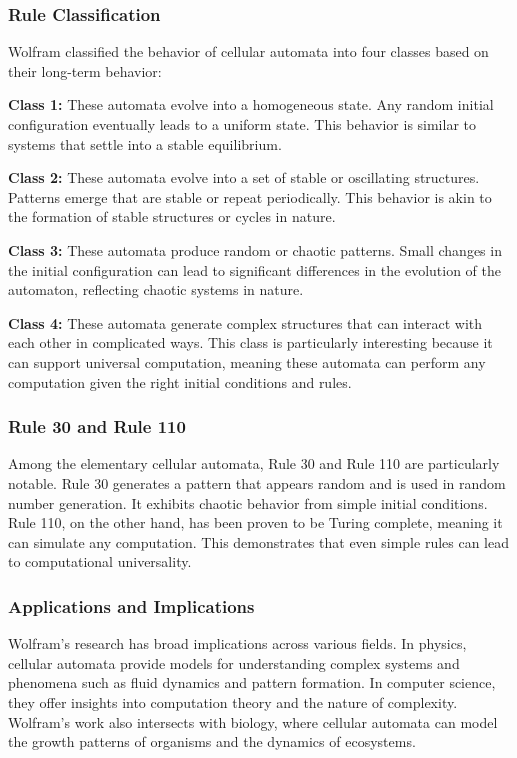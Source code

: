 \documentclass[9pt,a4paper,twoside]{tau-class/tau}
\begin{document}
    \subsubsection{Rule Classification}

    Wolfram classified the behavior of cellular automata into four classes based on their long-term behavior:\cite{wolfram1984}

    \textbf{Class 1:} These automata evolve into a homogeneous state. Any random initial configuration eventually leads to a uniform state. This behavior is similar to systems that settle into a stable equilibrium.

    \textbf{Class 2:} These automata evolve into a set of stable or oscillating structures. Patterns emerge that are stable or repeat periodically. This behavior is akin to the formation of stable structures or cycles in nature.

    \textbf{Class 3:} These automata produce random or chaotic patterns. Small changes in the initial configuration can lead to significant differences in the evolution of the automaton, reflecting chaotic systems in nature.

    \textbf{Class 4:} These automata generate complex structures that can interact with each other in complicated ways. This class is particularly interesting because it can support universal computation, meaning these automata can perform any computation given the right initial conditions and rules.

    \subsubsection{Rule 30 and Rule 110}

    Among the elementary cellular automata, Rule 30 and Rule 110 are particularly notable. Rule 30 generates a pattern that appears random and is used in random number generation.\cite{wolfram2002}\cite{cook2004} It exhibits chaotic behavior from simple initial conditions. Rule 110, on the other hand, has been proven to be Turing complete, meaning it can simulate any computation. This demonstrates that even simple rules can lead to computational universality.

    \subsubsection{Applications and Implications}

    Wolfram's research has broad implications across various fields. In physics, cellular automata provide models for understanding complex systems and phenomena such as fluid dynamics and pattern formation. In computer science, they offer insights into computation theory and the nature of complexity. Wolfram's work also intersects with biology, where cellular automata can model the growth patterns of organisms and the dynamics of ecosystems.
\end{document}
